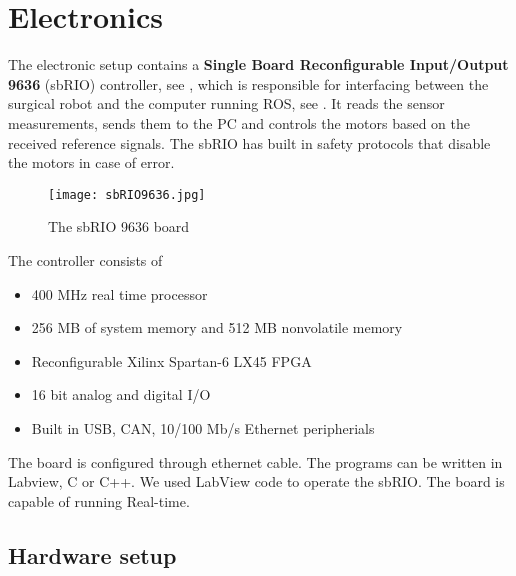 \section{Electronics}\label{sec:electronics}

The electronic setup \cite{Chris_Surgical} contains a \textbf{Single Board Reconfigurable Input/Output 9636} (sbRIO) controller, see , which is responsible for interfacing between the surgical robot and the computer running ROS, see . It reads the sensor measurements, sends them to the PC and controls the motors based on the received reference signals. The sbRIO has built in safety protocols that disable the motors in case of error.

\begin{figure}[H]
	\centering
		\centering
		\texttt{[image: sbRIO9636.jpg]}
		\caption{The sbRIO 9636 board\cite{sbRIO9636Pic}}
		\label{fig:sbRIO9636}
\end{figure}


The controller consists of
\begin{itemize}
	\item 400 MHz real time processor
	\item 256 MB of system memory and 512 MB nonvolatile memory
	\item Reconfigurable Xilinx Spartan-6 LX45 FPGA
	\item 16 bit analog and digital I/O
	\item Built in USB, CAN, 10/100 Mb/s Ethernet peripherials
\end{itemize}

The board is configured through ethernet cable. The programs can be written in Labview, C or C++. We used LabView code to operate the sbRIO. The board is capable of running Real-time. %


\subsection{Hardware setup}

